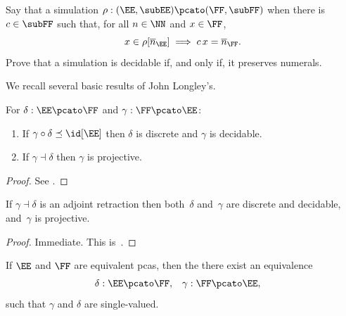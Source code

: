 \begin{exercise}
  \label{exc:simulation-numerals}%
  Say that a simulation $\rho: (\EE, \subEE) \pcato (\FF, \subFF)$ 
  when there is $c \in \subFF$ such that, for all $n \in \NN$ and $x \in \FF$,
  \begin{equation*}
    x \in \rho[\overline{n}_\EE] \implies c \, x = \overline{n}_\FF.
  \end{equation*}
  Prove that a simulation is decidable if, and only if, it preserves numerals.
\end{exercise}

We recall several basic results of John Longley's.

\begin{theorem}
  \label{th:simulation-properties2}%
  For $\delta: \EE \pcato \FF$ and $\gamma: \FF \pcato \EE$:
  \begin{enumerate}
  \item
    If $\gamma \circ \delta \preceq \id[\EE]$ then $\delta$ is discrete 
    and $\gamma$ is decidable.
  \item
    If $\gamma \dashv \delta$ then $\gamma$ is projective.
  \end{enumerate}
\end{theorem}

\begin{proof}
  See \cite[Theorem 2.5.3]{Longley:95}.
\end{proof}

\begin{corollary}
  \label{th:simulation-properties}%
  If $\gamma \dashv \delta$ is an adjoint retraction then both~$\delta$
  and~$\gamma$ are discrete and decidable, and~$\gamma$ is projective.
\end{corollary}

\begin{proof}
  Immediate. This is~\cite[Corollary 2.5.4]{Longley:95}.
\end{proof}

\begin{corollary}
  \label{th:simulation-properties-more}%
  If $\EE$ and $\FF$ are equivalent pcas, then the there exist an equivalence
  \begin{align*}
    \delta &: \EE \pcato \FF,
    &
    \gamma &: \FF \pcato \EE,
  \end{align*}
  such that $\gamma$ and $\delta$ are single-valued.
\end{corollary}

